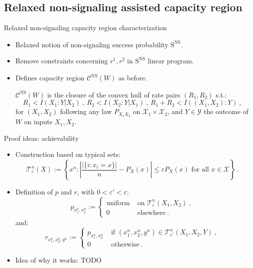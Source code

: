 \documentclass{beamer}
\theoremstyle{definition}
\theoremstyle{remark}
\begin{document}
\subsection{Relaxed non-signaling assisted capacity region}
\begin{frame}{Relaxed non-signaling capacity region characterization}
  \begin{itemize}
  \item Relaxed notion of non-signaling success probability $\mathrm{S}^{\overline{\mathrm{NS}}}$.
  \item Remove constraints concerning $r^1,r^2$ in $\mathrm{S}^{\mathrm{NS}}$ linear program.
    \pause
    \bigskip
  \item Defines capacity region $\mathcal{C}^{\overline{\mathrm{NS}}}(W)$ as before.
    \pause
    \bigskip
      \begin{theorem}
        \label{theo:CharaNSrelaxed}
        $\mathcal{C}^{\overline{\mathrm{NS}}}(W)$ is the closure of the convex hull of rate pairs $(R_1,R_2)$ s.t.:
        \[ R_1 < I(X_1:Y|X_2)\ ,\ R_2 < I(X_2:Y|X_1)\ ,\ R_1+R_2 < I((X_1,X_2):Y) \ ,\]
        for $(X_1,X_2)$ following \alert{any law $P_{X_1X_2}$ on $\mathcal{X}_1 \times \mathcal{X}_2$}, and $Y \in \mathcal{Y}$ the outcome of $W$ on inputs $X_1,X_2$.
  \end{theorem}
  \end{itemize}
\end{frame}

\begin{frame}{Proof ideas: achievability}
  \begin{itemize}
  \item Construction based on typical sets:
    \[  \mathcal{T}^n_{\varepsilon}(X) := \left\{x^n : \left|\frac{|\{i : x_i=x\}|}{n} - P_{X}(x)\right|\leq \varepsilon P_{X}(x) \text{ for all } x \in \mathcal{X}\right\}  \ .\]
    \pause
  \item Definition of $p$ and $r$, with $0 < \varepsilon' < \varepsilon$:
      \[ p_{x_1^n,x_2^n} := \begin{cases}
    \text{uniform} & \text{ on } \mathcal{T}^n_{\varepsilon}(X_1,X_2) \ , \\
    0 & \text{ elsewhere} \ .
  \end{cases}
  \]
  and:
  \[ r_{x_1^n,x_2^n,y^n} := \begin{cases}
    p_{x_1^n,x_2^n} & \text{ if } (x_1^n,x_2^n,y^n) \in \mathcal{T}^n_{\varepsilon'}(X_1,X_2,Y) \ ,\\
    0 & \text{ otherwise} \ .
  \end{cases}
    \]

        \pause
        \bigskip
  \item Idea of why it works: TODO
  \end{itemize}
\end{frame}
\end{document}
